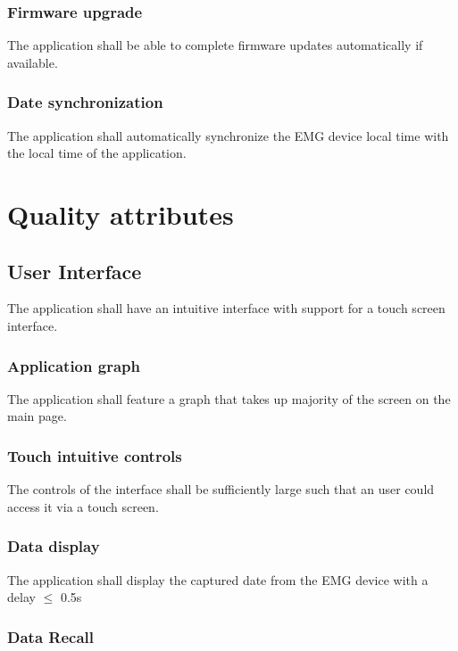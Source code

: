 \documentclass[12pt,a4paper]{article}
\begin{document}
\subsubsection{Firmware upgrade}

The application shall be able to complete firmware updates automatically if available.

\subsubsection{Date synchronization}

The application shall automatically synchronize the EMG device local time with the local time of the application.

\newpage

\section{Quality attributes}

\subsection{User Interface}

The application shall have an intuitive interface with support for a touch screen interface.

\subsubsection{Application graph}

The application shall feature a graph that takes up majority of the screen on the main page.

\subsubsection{Touch intuitive controls}

The controls of the interface shall be sufficiently large such that an user could access it via a touch screen.

\subsubsection{Data display}

The application shall display the captured date from the EMG device with a delay $\leq$ 0.5s

\subsubsection{Data Recall}
\end{document}
